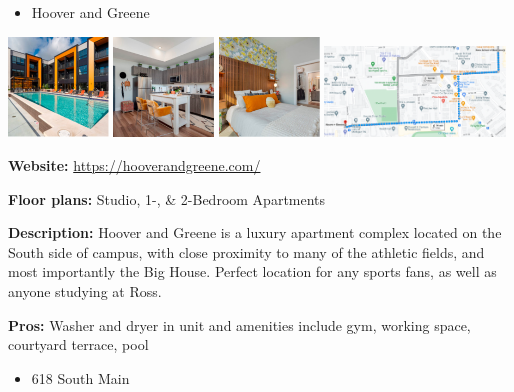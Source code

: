 \documentclass[
]{book}
\providecommand{\tightlist}{%
  \setlength{\itemsep}{0pt}\setlength{\parskip}{0pt}}
\begin{document}
\begin{itemize}
\tightlist
\item
  Hoover and Greene
\end{itemize}

\includegraphics[width=0.2\textwidth,height=\textheight]{HG_exterior.png}
\includegraphics[width=0.2\textwidth,height=\textheight]{HG_interior1.png}
\includegraphics[width=0.2\textwidth,height=\textheight]{HG_interior2.png}
\includegraphics[width=0.36\textwidth,height=\textheight]{HG_map.png}

\textbf{Website:} \url{https://hooverandgreene.com/}

\textbf{Floor plans:} Studio, 1-, \& 2-Bedroom Apartments

\textbf{Description:} Hoover and Greene is a luxury apartment complex located on the South side of campus, with close proximity to many of the athletic fields, and most importantly the Big House. Perfect location for any sports fans, as well as anyone studying at Ross.

\textbf{Pros:} Washer and dryer in unit and amenities include gym, working space, courtyard terrace, pool

\begin{itemize}
\tightlist
\item
  618 South Main
\end{itemize}
\end{document}

